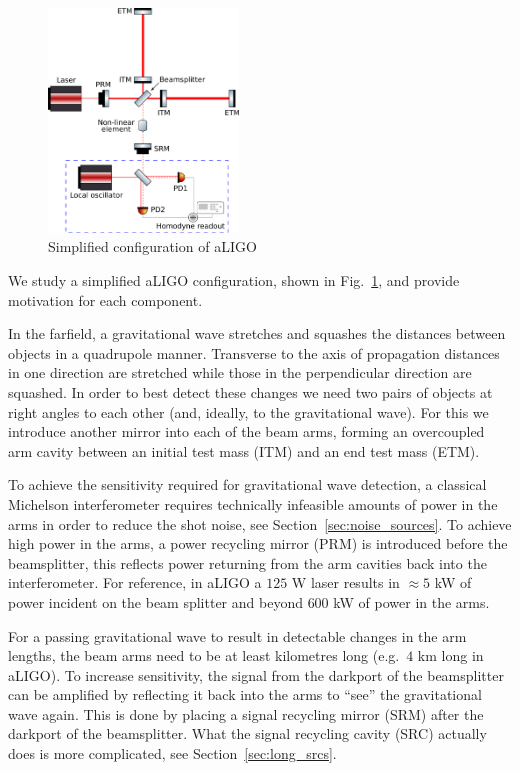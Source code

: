 \documentclass[aps,pra,superscriptaddress,reprint,nofootinbib]{revtex4-1}
\begin{document}
\begin{figure}
	\begin{center}
	\includegraphics[width=0.45\textwidth]{figures/aLIGO_internal_squeezing.pdf}
	\end{center}
	\caption{Simplified configuration of aLIGO}
	\label{fig:aLIGO_configuration}
\end{figure}
We study a simplified aLIGO configuration, shown in Fig.~\ref{fig:aLIGO_configuration}, and provide motivation for each component.


In the farfield, a gravitational wave stretches and squashes the distances between objects in a quadrupole manner. Transverse to the axis of propagation distances in one direction are stretched while those in the perpendicular direction are squashed. In order to best detect these changes we need two pairs of objects at right angles to each other (and, ideally, to the gravitational wave). For this we introduce another mirror into each of the beam arms, forming an overcoupled arm cavity between an initial test mass (ITM) and an end test mass (ETM).


To achieve the sensitivity required for gravitational wave detection, a classical Michelson interferometer requires technically infeasible amounts of power in the arms in order to reduce the shot noise, see Section~\ref{sec:noise_sources}.
To achieve high power in the arms, a power recycling mirror (PRM) is introduced before the beamsplitter, this reflects power returning from the arm cavities back into the interferometer. For reference, in aLIGO a $125$ W laser results in $\approx 5$ kW of power incident on the beam splitter and beyond $600$ kW of power in the arms.


For a passing gravitational wave to result in detectable changes in the arm lengths, the beam arms need to be at least kilometres long (e.g.\ $4$ km long in aLIGO). To increase sensitivity, the signal from the darkport of the beamsplitter can be amplified by reflecting it back into the arms to ``see'' the gravitational wave again. This is done by placing a signal recycling mirror (SRM) after the darkport of the beamsplitter. What the signal recycling cavity (SRC) actually does is more complicated, see Section~\ref{sec:long_srcs}.
\end{document}
